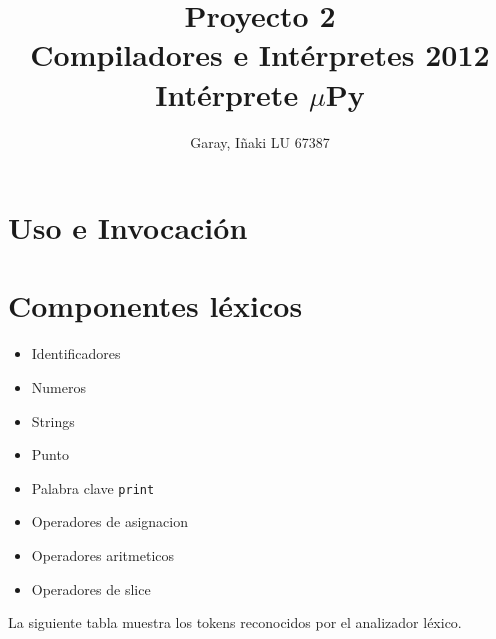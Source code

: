 \documentclass [a4paper,titlepage]{report}
\title{Proyecto 2\\Compiladores e Intérpretes 2012\\Intérprete $\mu$Py}
\author{Garay, I\~{n}aki LU 67387}
\begin{document}
\maketitle

\tableofcontents

\chapter{Uso e Invocación}

\chapter{Componentes léxicos}

\begin{itemize}
\item Identificadores
\item Numeros
\item Strings
\item Punto
\item Palabra clave \texttt{print}
\item Operadores de asignacion
\item Operadores aritmeticos
\item Operadores de slice
\end{itemize}

La siguiente tabla muestra los tokens reconocidos por el analizador léxico.
\end{document}
